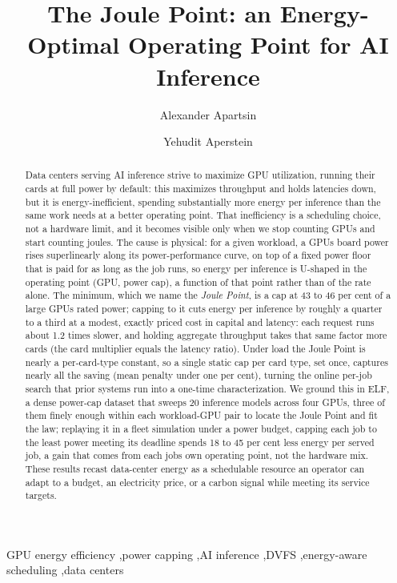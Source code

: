 \documentclass[3p,twocolumn]{elsarticle}
\begin{document}
\begin{frontmatter}
\title{\vspace*{-2\baselineskip}The Joule Point: an Energy-Optimal Operating Point for AI Inference}

\author[hit]{Alexander Apartsin}
\author[afeka]{Yehudit Aperstein}
\address[hit]{Holon Institute of Technology, Holon, Israel}
\address[afeka]{Afeka Academic College of Engineering, Tel Aviv, Israel}

\begin{abstract}
Data centers serving AI inference strive to maximize GPU utilization, running their cards at full power by
default: this maximizes throughput and holds latencies down, but it is energy-inefficient, spending substantially
more energy per inference than the same work needs at a better operating point. That inefficiency is a scheduling choice, not a hardware
limit, and it becomes visible only when we stop counting GPUs and start counting joules. The cause is physical:
for a given workload, a GPU\textquotesingle s board power rises superlinearly along its power-performance curve, on top of a fixed power floor that is paid
for as long as the job runs, so energy per inference is U-shaped in the operating point (GPU, power cap), a
function of that point rather than of the rate alone. The minimum, which we name the \emph{Joule Point}, is a
cap at 43 to 46 per cent of a large GPU\textquotesingle s rated power; capping to it cuts energy per
inference by roughly a quarter to a third at a modest, exactly priced cost in capital and latency: each request
runs about 1.2 times slower, and holding aggregate throughput takes that same factor more cards (the card
multiplier equals the latency ratio). Under load the Joule Point is nearly a per-card-type constant, so a single
static cap per card type, set once, captures nearly all the saving (mean penalty under one per cent), turning the
online per-job search that prior systems run into a one-time characterization. We ground this in ELF, a dense
power-cap dataset that sweeps 20 inference models across four GPUs, three of them finely enough within each workload-GPU pair to
locate the Joule Point and fit the law; replaying it in a fleet simulation under a power budget, capping each job
to the least power meeting its deadline spends 18 to 45 per cent less energy per served
job, a gain that comes from each job\textquotesingle s own operating point, not the hardware mix. These results recast
data-center energy as a schedulable resource an operator can adapt to a budget, an electricity price, or a
carbon signal while meeting its service targets.
\end{abstract}

\begin{keyword}
GPU energy efficiency \sep power capping \sep AI inference \sep DVFS \sep energy-aware scheduling \sep data centers
\end{keyword}

\end{frontmatter}
\end{document}

